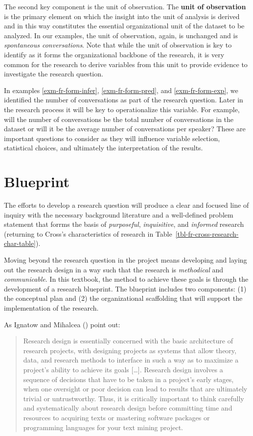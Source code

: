\documentclass[
  letterpaper,
  DIV=11,
  numbers=noendperiod]{scrreprt}
\theoremstyle{definition}
\theoremstyle{remark}
\begin{document}
The second key component is the unit of observation. The \textbf{unit of
observation} is the primary element on which the insight into the unit
of analysis is derived and in this way constitutes the essential
organizational unit of the dataset to be analyzed. In our examples, the
unit of observation, again, is unchanged and is \emph{spontaneous
conversations}. Note that while the unit of observation is key to
identify as it forms the organizational backbone of the research, it is
very common for the research to derive variables from this unit to
provide evidence to investigate the research question.

In examples \ref{exm-fr-form-infer}, \ref{exm-fr-form-pred}, and
\ref{exm-fr-form-exp}, we identified the number of conversations as part
of the research question. Later in the research process it will be key
to operationalize this variable. For example, will the number of
conversations be the total number of conversations in the dataset or
will it be the average number of conversations per speaker? These are
important questions to consider as they will influence variable
selection, statistical choices, and ultimately the interpretation of the
results.

\section{Blueprint}\label{sec-fr-blueprint}

The efforts to develop a research question will produce a clear and
focused line of inquiry with the necessary background literature and a
well-defined problem statement that forrms the basis of
\emph{purposeful}, \emph{inquisitive}, and \emph{informed} research
(returning to Cross's characteristics of research in
Table~\ref{tbl-fr-cross-research-char-table}).

Moving beyond the research question in the project means developing and
laying out the research design in a way such that the research is
\emph{methodical} and \emph{communicable}. In this textbook, the method
to achieve these goals is through the development of a research
blueprint. The blueprint includes two components: (1) the conceptual
plan and (2) the organizational scaffolding that will support the
implementation of the research.

As Ignatow and Mihalcea () point out:

\begin{quote}
Research design is essentially concerned with the basic architecture of
research projects, with designing projects as systems that allow theory,
data, and research methods to interface in such a way as to maximize a
project's ability to achieve its goals {[}\ldots{]}. Research design
involves a sequence of decisions that have to be taken in a project's
early stages, when one oversight or poor decision can lead to results
that are ultimately trivial or untrustworthy. Thus, it is critically
important to think carefully and systematically about research design
before committing time and resources to acquiring texts or mastering
software packages or programming languages for your text mining project.
\end{quote}
\end{document}
